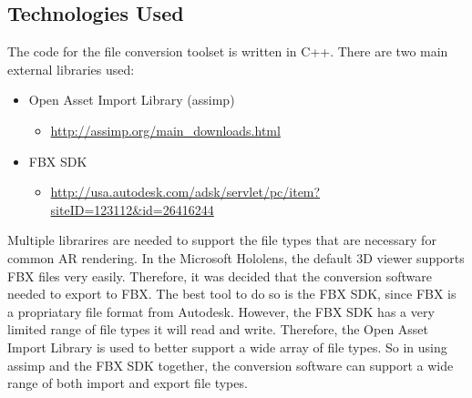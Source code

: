    \subsection{Technologies Used}
    
    The code for the file conversion toolset is written in C++.  There are two main external libraries used:
    \begin{itemize}
        \item Open Asset Import Library (assimp)
        \begin{itemize}
            \item \url{http://assimp.org/main_downloads.html}
        \end{itemize}

        \item FBX SDK
        \begin{itemize}
            \item \url{http://usa.autodesk.com/adsk/servlet/pc/item?siteID=123112&id=26416244}
        \end{itemize}
    \end{itemize}

    Multiple librarires are needed to support the file types that are necessary for common AR rendering.  In the Microsoft Hololens, the default
    3D viewer supports FBX files very easily.  Therefore, it was decided that the conversion software needed to export to FBX.  The best tool to do 
    so is the FBX SDK, since FBX is a propriatary file format from Autodesk.  However, the FBX SDK has a very limited range of file types it will read and write.
    Therefore, the Open Asset Import Library is used to better support a wide array of file types.  So in using assimp and the FBX SDK together,
    the conversion software can support a wide range of both import and export file types.

